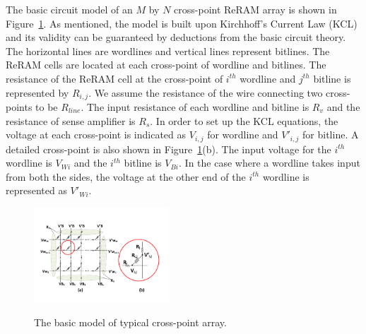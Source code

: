 

\label{sec:app}

 The basic circuit model of an $M$ by $N$ cross-point
ReRAM array is shown in Figure~\ref{fig:modeling}. As mentioned, the model
is built upon Kirchhoff's Current Law (KCL) and its validity can be
guaranteed by deductions from the basic circuit theory. The horizontal
lines are wordlines and vertical lines represent bitlines. The ReRAM cells
are located at each cross-point of wordline and bitlines. The resistance
of the ReRAM cell at the cross-point of $i^{th}$ wordline and $j^{th}$
bitline is represented by $R_{i,j}$. We assume the resistance of the wire
connecting two cross-points to be $R_{line}$. The input resistance of each
wordline and bitline is $R_v$ and the resistance of sense amplifier is
$R_s$. In order to set up the KCL equations, the voltage at each
cross-point is indicated as $V_{i,j}$ for wordline and $V'_{i,j}$ for
bitline. A detailed cross-point is also shown in
Figure~\ref{fig:modeling}(b). The input voltage for the $i^{th}$ wordline
is $V_{Wi}$ and the $i^{th}$ bitline is $V_{Bi}$. In the case where a
wordline takes input from both the sides, the voltage at the other end of
the $i^{th}$ wordline is represented as $V'_{Wi}$.

\begin{figure}%
\centering
  \includegraphics[width=0.45\textwidth]{./figures/model_f.pdf}\\
  \caption{The basic model of typical cross-point array.}\label{fig:modeling}
  \vspace{-12pt}
\end{figure}

